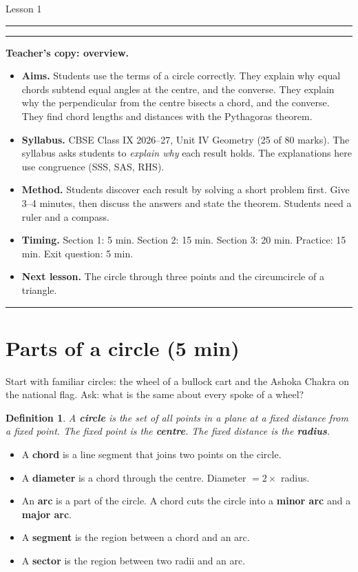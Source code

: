 \documentclass[11pt,a4paper]{article}
\theoremstyle{brand}
\theoremstyle{branddef}
\newtheorem{definition}{Definition}
\renewcommand{\colorbox}[2]{\par\smallskip\noindent\textcolor{black!35}{\rule{\linewidth}{0.4pt}}\par\nointerlineskip\vspace{3pt}\noindent#2\par\vspace{2pt}\noindent\textcolor{black!35}{\rule{\linewidth}{0.4pt}}\par\smallskip}
\begin{document}
\hfill{\large Lesson 1}\par\vspace{3pt}
\noindent\rule{\linewidth}{0.6pt}\par\medskip

\colorbox{panel}{%
  \parbox{\dimexpr\linewidth-2\fboxsep\relax}{%
    \small\textbf{Teacher's copy: overview.}
    \begin{itemize}[leftmargin=1.6em,itemsep=1pt,topsep=2pt]
      \item \textbf{Aims.} Students use the terms of a circle correctly. They explain why equal chords subtend equal angles at the centre, and the converse. They explain why the perpendicular from the centre bisects a chord, and the converse. They find chord lengths and distances with the Pythagoras theorem.
      \item \textbf{Syllabus.} CBSE Class IX 2026--27, Unit IV Geometry (25 of 80 marks). The syllabus asks students to \emph{explain why} each result holds. The explanations here use congruence (SSS, SAS, RHS).
      \item \textbf{Method.} Students discover each result by solving a short problem first. Give 3--4 minutes, then discuss the answers and state the theorem. Students need a ruler and a compass.
      \item \textbf{Timing.} Section 1: 5 min. Section 2: 15 min. Section 3: 20 min. Practice: 15 min. Exit question: 5 min.
      \item \textbf{Next lesson.} The circle through three points and the circumcircle of a triangle.
    \end{itemize}}}

\section{Parts of a circle \normalfont\small(5 min)}

Start with familiar circles: the wheel of a bullock cart and the Ashoka Chakra on the national flag. Ask: what is the same about every spoke of a wheel?

\begin{definition}
A \textbf{circle} is the set of all points in a plane at a fixed distance from a fixed point. The fixed point is the \textbf{centre}. The fixed distance is the \textbf{radius}.
\end{definition}

\begin{itemize}[leftmargin=1.8em,itemsep=1pt]
  \item A \textbf{chord} is a line segment that joins two points on the circle.
  \item A \textbf{diameter} is a chord through the centre. Diameter $=2\times$ radius.
  \item An \textbf{arc} is a part of the circle. A chord cuts the circle into a \textbf{minor arc} and a \textbf{major arc}.
  \item A \textbf{segment} is the region between a chord and an arc.
  \item A \textbf{sector} is the region between two radii and an arc.
\end{itemize}
\end{document}
